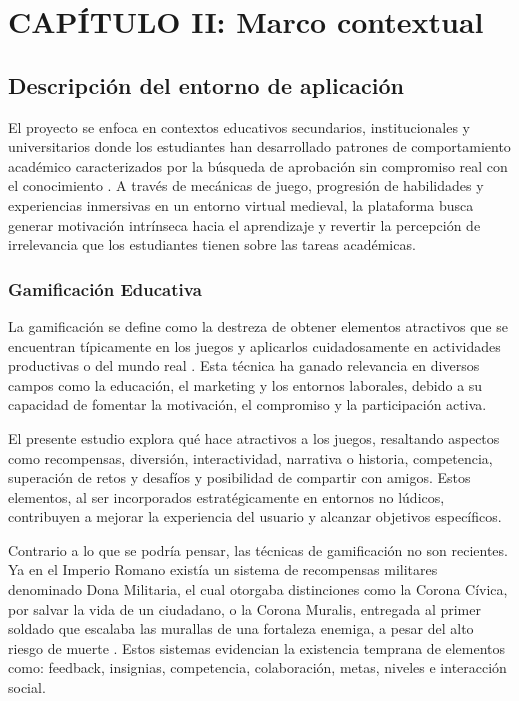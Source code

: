 \section{CAPÍTULO II: Marco contextual}

\subsection{Descripción del entorno de aplicación}

El proyecto se enfoca en contextos educativos secundarios, institucionales y universitarios donde los estudiantes han desarrollado patrones de comportamiento académico caracterizados por la búsqueda de aprobación sin compromiso real con el conocimiento \cite{academic_shortcuts2023,bretag2019}. A través de mecánicas de juego, progresión de habilidades y experiencias inmersivas en un entorno virtual medieval, la plataforma busca generar motivación intrínseca hacia el aprendizaje y revertir la percepción de irrelevancia que los estudiantes tienen sobre las tareas académicas.

\subsubsection{Gamificación Educativa}

La gamificación se define como la destreza de obtener elementos atractivos que se encuentran típicamente en los juegos y aplicarlos cuidadosamente en actividades productivas o del mundo real \cite{deterding2011}. Esta técnica ha ganado relevancia en diversos campos como la educación, el marketing y los entornos laborales, debido a su capacidad de fomentar la motivación, el compromiso y la participación activa.

El presente estudio explora qué hace atractivos a los juegos, resaltando aspectos como recompensas, diversión, interactividad, narrativa o historia, competencia, superación de retos y desafíos y posibilidad de compartir con amigos. Estos elementos, al ser incorporados estratégicamente en entornos no lúdicos, contribuyen a mejorar la experiencia del usuario y alcanzar objetivos específicos.

Contrario a lo que se podría pensar, las técnicas de gamificación no son recientes. Ya en el Imperio Romano existía un sistema de recompensas militares denominado Dona Militaria, el cual otorgaba distinciones como la Corona Cívica, por salvar la vida de un ciudadano, o la Corona Muralis, entregada al primer soldado que escalaba las murallas de una fortaleza enemiga, a pesar del alto riesgo de muerte \cite{polybius_histories}. Estos sistemas evidencian la existencia temprana de elementos como: feedback, insignias, competencia, colaboración, metas, niveles e interacción social.

